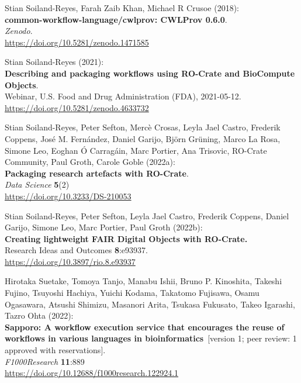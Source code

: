 \documentclass[10pt,letterpaper]{article}
\begin{document}
\begin{thebibliography}{10}
\begin{small}
Stian Soiland-Reyes, Farah Zaib Khan, Michael R Crusoe (2018):\\
\textbf{common-workflow-language/cwlprov: CWLProv 0.6.0}.\\
\emph{Zenodo}.\\
\url{https://doi.org/10.5281/zenodo.1471585}

Stian Soiland-Reyes (2021):\\
\textbf{Describing and packaging workflows using RO-Crate and BioCompute Objects}.\\
Webinar, U.S. Food and Drug Administration (FDA), 2021-05-12.\\
\url{https://doi.org/10.5281/zenodo.4633732}


Stian Soiland-Reyes, Peter Sefton, Mercè
Crosas, Leyla Jael Castro, Frederik Coppens, José M. Fernández, Daniel
Garijo, Björn Grüning, Marco La Rosa, Simone Leo, Eoghan Ó Carragáin,
Marc Portier, Ana Trisovic, RO-Crate Community, Paul Groth, Carole Goble
(2022a):\\
\textbf{Packaging research artefacts with RO-Crate}.\\
\emph{Data Science} \textbf{5}(2)\\
\url{https://doi.org/10.3233/DS-210053}


 Stian Soiland-Reyes, Peter Sefton, Leyla Jael
Castro, Frederik Coppens, Daniel Garijo, Simone Leo, Marc Portier, Paul
Groth (2022b):\\
\textbf{Creating lightweight FAIR Digital Objects with RO-Crate.}\\
Research Ideas and Outcomes \textbf{8}:e93937.\\
\url{https://doi.org/10.3897/rio.8.e93937}


 Hirotaka Suetake, Tomoya Tanjo, Manabu Ishii, Bruno
P. Kinoshita, Takeshi Fujino, Tsuyoshi Hachiya, Yuichi Kodama, Takatomo
Fujisawa, Osamu Ogasawara, Atsushi Shimizu, Masanori Arita, Tsukasa
Fukusato, Takeo Igarashi, Tazro Ohta (2022):\\
\textbf{Sapporo: A workflow execution service that encourages the reuse
of workflows in various languages in bioinformatics}~[version 1; peer review: 1 approved with reservations].\\
\emph{F1000Research} \textbf{11}:889\\
\url{https://doi.org/10.12688/f1000research.122924.1}


\end{small}
\end{thebibliography}
\end{document}
